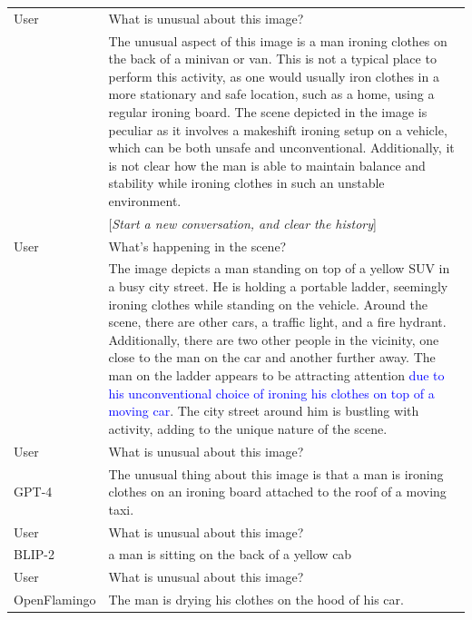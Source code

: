 \begin{table}
\begin{minipage}{0.99\textwidth}
{\begin{tabular}{l p{12.5cm} }
User & What is unusual about this image? \\
\shortname{} & The unusual aspect of this image is a man ironing clothes on the back of a minivan or van. This is not a typical place to perform this activity, as one would usually iron clothes in a more stationary and safe location, such as a home, using a regular ironing board. The scene depicted in the image is peculiar as it involves a makeshift ironing setup on a vehicle, which can be both unsafe and unconventional. Additionally, it is not clear how the man is able to maintain balance and stability while ironing clothes in such an unstable environment.
\\
 & [{\it Start a new conversation, and clear the history}] \\
User & What’s happening in the scene? \\
\shortname{} & The image depicts a man standing on top of a yellow SUV in a busy city street. He is holding a portable ladder, seemingly ironing clothes while standing on the vehicle. Around the scene, there are other cars, a traffic light, and a fire hydrant. Additionally, there are two other people in the vicinity, one close to the man on the car and another further away. The man on the ladder appears to be attracting attention \textcolor{blue}{due to his unconventional choice of ironing his clothes on top of a moving car}. The city street around him is bustling with activity, adding to the unique nature of the scene.
\\
\midrule
User & What is unusual about this image? \\
GPT-4~\cite{gpt4} &  The unusual thing about this image is that a man is ironing clothes on an ironing
board attached to the roof of a moving taxi.
\\ \midrule
User & What is unusual about this image? \\
BLIP-2 & a man is sitting on the back of a yellow cab
\\ \midrule
User & What is unusual about this image? \\
OpenFlamingo & The man is drying his clothes on the hood of his car.
\\
\bottomrule
\end{tabular}
}
\vspace{1mm}
\vspace{-5mm}
\label{tab:visual_example_ironing}  
  \end{minipage}
\end{table}


